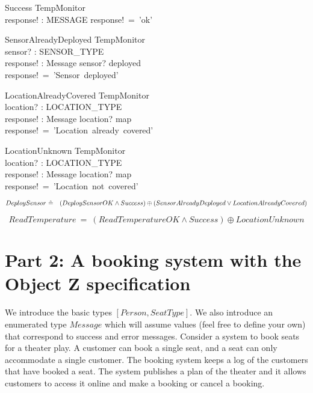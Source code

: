 \documentclass[12pt]{article}
\begin{document}
\begin{schema}{Success}
\Xi TempMonitor\\
response! : MESSAGE
\where
response!~=~'ok'\\
\end{schema}



\begin{schema}{SensorAlreadyDeployed}
\Xi TempMonitor\\
sensor? : SENSOR\_TYPE\\
response! : Message
\ST
sensor? \in deployed\\
response!~=~'Sensor~deployed'
\end{schema}


\begin{schema}{LocationAlreadyCovered}
\Xi TempMonitor\\
location? : LOCATION\_TYPE\\
response! : Message
\ST
location? \in \ran map\\
response!~=~'Location~already~covered'
\end{schema}


\begin{schema}{LocationUnknown}
\Xi TempMonitor\\
location? : LOCATION\_TYPE\\
response! : Message
\ST
location? \notin \ran map\\
response!~=~'Location~not~covered'
\end{schema}

\[ DeploySensor~\hat{=}~\\
~~~(DeploySensorOK \wedge Success) \oplus (SensorAlreadyDeployed \vee LocationAlreadyCovered) \]



\[ ReadTemperature~\hat{=}~(ReadTemperatureOK \wedge Success) \oplus LocationUnknown \]



\newpage



\section*{Part 2:  A booking system with the Object Z specification}

We introduce the basic types $[Person, SeatType]$. We also introduce an enumerated type $Message$ which will assume values (feel free to define your own) that correspond to success and error messages. Consider a system to book seats for a theater play. A customer can book a single seat, and a seat can only accommodate a single customer. The booking system keeps a log of the customers that have booked a seat. The system publishes a plan of the theater and it allows customers to access it online and make a booking or cancel a booking.\\
\end{document}
